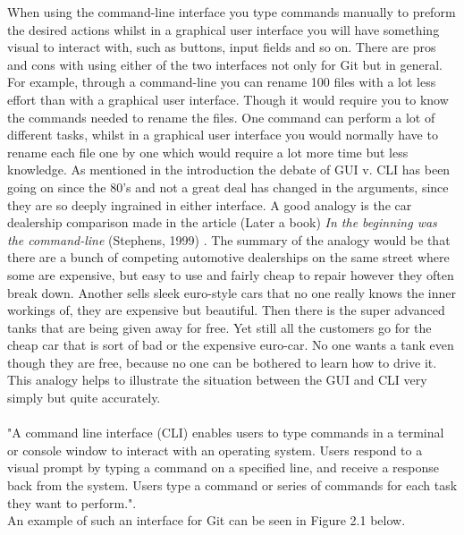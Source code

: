 \documentclass[a4paper,oneside]{bth} %
\begin{document}
			When using the command-line interface you type commands manually to preform the desired actions whilst in a graphical user interface you will have something visual to interact with, such as buttons, input fields and so on.
			There are pros and cons with using either of the two interfaces not only for Git but in general.
			For example, through a command-line you can rename 100 files with a lot less effort than with a graphical user interface. Though it would require you to know the commands needed to rename the files. One command can perform a lot of different tasks, whilst in a graphical user interface you would normally have to rename each file one by one which would require a lot more time but less knowledge. As mentioned in the introduction the debate of GUI v. CLI has been going on since the 80's and not a great deal has changed in the arguments, since they are so deeply ingrained in either interface. 
			A good analogy is the car dealership comparison made in the article (Later a book) \textit{In the beginning was the command-line} (Stephens, 1999) \cite{InTheBeginning}. The summary of the analogy would be that there are a bunch of competing automotive dealerships on the same street where some are expensive, but easy to use and fairly cheap to repair however they often break down. Another sells sleek euro-style cars that no one really knows the inner workings of, they are expensive but beautiful. Then there is the super advanced tanks that are being given away for free. Yet still all the customers go for the cheap car that is sort of bad or the expensive euro-car. No one wants a tank even though they are free, because no one can be bothered to learn how to drive it. 
			This analogy helps to illustrate the situation between the GUI and CLI very simply but quite accurately.
			\\\\
			"A command line interface (CLI) enables users to type commands in a terminal or console window to interact with an operating system. Users respond to a visual prompt by typing a command on a specified line, and receive a response back from the system. Users type a command or series of commands for each task they want to perform."\cite{OracleCLIAndGUI}.\\
			An example of such an interface for Git can be seen in Figure 2.1 below.
			
\end{document}
